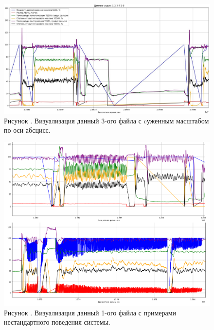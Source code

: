 {  \begin{figure}
    \centering
    \def\svgwidth{\textwidth}
    \includegraphics[scale=0.6]{images/data_3_visual.jpg}
    \caption*{\gostFont Рисунок \thechaptercntr .\theimagecntr \spc {--} Визуализация данный 3-ого файла с cуженным масштабом по оси абсцисс.}
    \label{fig:NNBlackBox}

  \end{figure} \addtocounter{imagecntr}{1}

  \begin{figure}
    \centering
    \def\svgwidth{\textwidth}
    \includegraphics[scale=0.5]{images/data_1_anomaly.png}
    \caption*{\gostFont Рисунок \thechaptercntr .\theimagecntr \spc {--} Визуализация данный 1-ого файла с примерами нестандартного поведения системы.}
    \label{fig:NNBlackBox}
  \end{figure} \addtocounter{imagecntr}{1}

}
